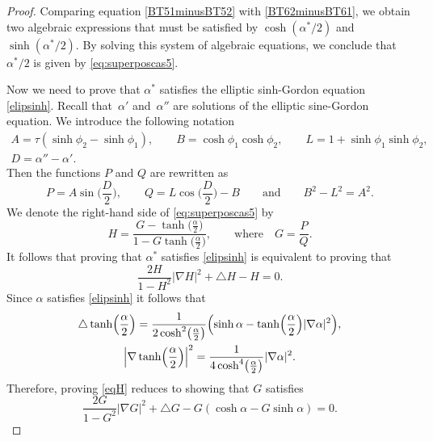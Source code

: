 \documentclass[10pt,a4paper]{amsart}
\numberwithin{equation}{section}
\begin{document}
\begin{proof}
Comparing equation \eqref{BT51minusBT52} with \eqref{BT62minusBT61}, we obtain two algebraic
expressions that must be satisfied by $\cosh(\alpha^*/2)$ and $\sinh(\alpha^*/2)$.
By solving this system of algebraic equations, we conclude that $\alpha^*/2$ is given by
\eqref{eq:superposcas5}.

Now we need to prove that $\alpha^*$ satisfies the elliptic sinh-Gordon equation \eqref{elipsinh}.
Recall that~$\alpha'$ and~$\alpha''$ are solutions of the elliptic sine-Gordon equation.
We introduce the following notation
\begin{gather}
A=\tau(\sinh\phi_2-\sinh\phi_1),\qquad B=\cosh\phi_1\cosh\phi_2,\qquad L=1+\sinh\phi_1\sinh\phi_2, \nonumber\\
 D=\alpha''-\alpha'.\label{ABLD}
\end{gather}
Then the functions $P$ and $Q$ are rewritten as
\begin{equation*}%
P=A\sin\biggl(\frac{D}{2}\biggr),\qquad Q=L\cos\biggl(\frac{D}{2}\biggr)-B \qquad \mbox {and}\qquad B^2-L^2=A^2.
\end{equation*}
We denote the right-hand side of \eqref{eq:superposcas5} by
\begin{equation*}%
H=\frac{G-\tanh\bigl(\frac{\alpha}{2}\bigr)}{1-G\tanh\bigl(\frac{\alpha}{2}\bigr)}, \qquad \mbox{where}\quad G=\frac{P}{Q}.
\end{equation*}
It follows that proving that $\alpha^*$ satisfies \eqref{elipsinh} is equivalent to proving that
\begin{equation}\label{eqH}
\frac{2H}{1-H^2}|\nabla H|^2+ \triangle H-H=0.
\end{equation}
Since $\alpha$ satisfies \eqref{elipsinh} it follows that
\begin{gather*}
\triangle \tanh \Bigl(\frac{\alpha}{2}\Bigr)= \frac{1}{2\cosh^2\bigl(\frac{\alpha}{2}\bigr)}\Bigl(\sinh \alpha-\tanh\Bigl(\frac{\alpha}{2}\Bigr)|\nabla\alpha|^2\Bigr), \\
\Bigl|\nabla\tanh\Bigl(\frac{\alpha}{2}\Bigr)\Bigr|^2=\frac{1}{4\cosh^4 \bigl(\frac{\alpha}{2}\bigr)}
|\nabla \alpha|^2.
\end{gather*}
Therefore, proving \eqref{eqH} reduces to showing
that $G$ satisfies
\begin{equation}\label{eqG}
\frac{2G}{1-G^2}|\nabla G|^2+\triangle G-G(\cosh \alpha-G\sinh\alpha)=0.
\end{equation}


\end{proof}
\end{document}
